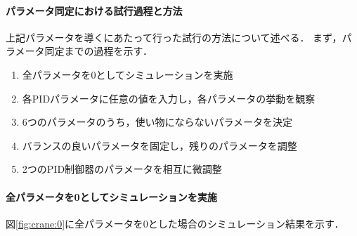 \documentclass[dvipdfmx,titlepage,a4j]{jsarticle}  %
\begin{document}
\paragraph{パラメータ同定における試行過程と方法}
上記パラメータを導くにあたって行った試行の方法について述べる．
まず，パラメータ同定までの過程を示す．
\begin{enumerate}
  \item 全パラメータを0としてシミュレーションを実施
  \item 各PIDパラメータに任意の値を入力し，各パラメータの挙動を観察
  \item 6つのパラメータのうち，使い物にならないパラメータを決定
  \item バランスの良いパラメータを固定し，残りのパラメータを調整
  \item 2つのPID制御器のパラメータを相互に微調整
\end{enumerate}

\paragraph{全パラメータを0としてシミュレーションを実施\\}
図\ref{fig:crane:0}に全パラメータを0とした場合のシミュレーション結果を示す．
\end{document}
